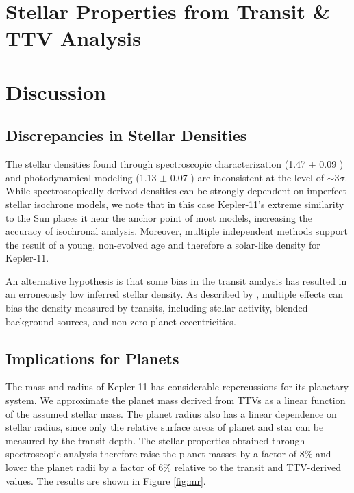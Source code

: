 \documentclass[oneside]{emulateapj}
\begin{document}



\section{Stellar Properties from Transit \& TTV Analysis}


\section{Discussion}
\subsection{Discrepancies in Stellar Densities}

The stellar densities found through spectroscopic characterization (1.47 $\pm$ 0.09 \gcm) and photodynamical modeling (1.13 $\pm$ 0.07 \gcm) are inconsistent at the level of $\sim$3$\sigma$. While spectroscopically-derived densities can be strongly dependent on imperfect stellar isochrone models, we note that in this case Kepler-11's extreme similarity to the Sun places it near the anchor point of most models, increasing the accuracy of isochronal analysis. Moreover, multiple independent methods support the result of a young, non-evolved age and therefore a solar-like density for Kepler-11.

An alternative hypothesis is that some bias in the transit analysis has resulted in an erroneously low inferred stellar density. As described by \citet{Kipping2014}, multiple effects can bias the density measured by transits, including stellar activity, blended background sources, and non-zero planet eccentricities. 

\subsection{Implications for Planets}

The mass and radius of Kepler-11 has considerable repercussions for its planetary system. We approximate the planet mass derived from TTVs as a linear function of the assumed stellar mass. The planet radius also has a linear dependence on stellar radius, since only the relative surface areas of planet and star can be measured by the transit depth. The stellar properties obtained through spectroscopic analysis therefore raise the planet masses by a factor of 8\% and lower the planet radii by a factor of 6\% relative to the transit and TTV-derived values. The results are shown in Figure \ref{fig:mr}.
\end{document}
